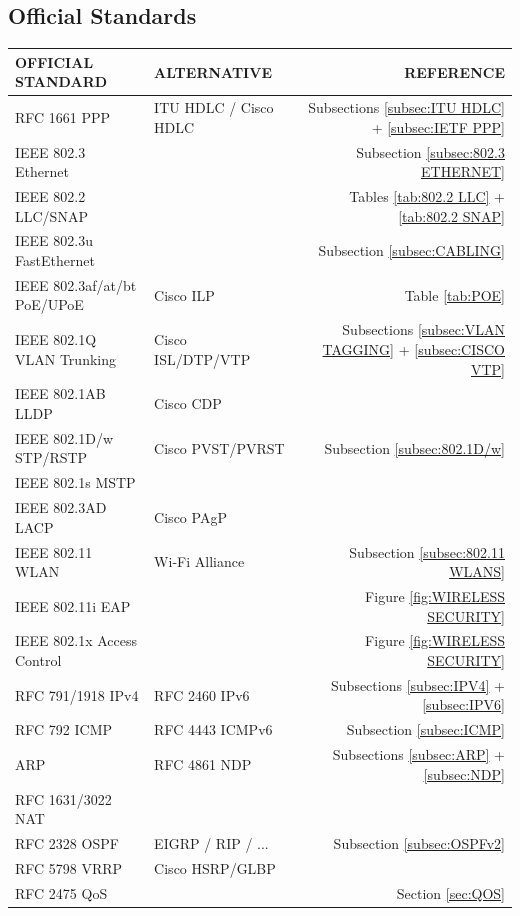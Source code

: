 \documentclass[12pt]{article}
\begin{document}
	\subsection{Official Standards \label{subsec:STANDARDS}}
	\begin{table}[H]
	\centering
	\begin{tabular}{llr}
	\textbf{OFFICIAL STANDARD}	& \textbf{ALTERNATIVE}		& \textbf{REFERENCE}\\\hline
	RFC 1661 PPP			& ITU HDLC / Cisco HDLC	& Subsections \ref{subsec:ITU HDLC} + \ref{subsec:IETF PPP}\\\hline
	IEEE 802.3 Ethernet		&					& Subsection \ref{subsec:802.3 ETHERNET}\\
	IEEE 802.2 LLC/SNAP		&					& Tables \ref{tab:802.2 LLC} + \ref{tab:802.2 SNAP}\\
	IEEE 802.3u FastEthernet		&					& Subsection \ref{subsec:CABLING}\\
	IEEE 802.3af/at/bt PoE/UPoE	& Cisco ILP				& Table \ref{tab:POE}\\\hline
	IEEE 802.1Q VLAN Trunking	& Cisco ISL/DTP/VTP		& Subsections \ref{subsec:VLAN TAGGING} + \ref{subsec:CISCO VTP}\\
	IEEE 802.1AB LLDP		& Cisco CDP			&\\
	IEEE 802.1D/w STP/RSTP		& Cisco PVST/PVRST		& Subsection \ref{subsec:802.1D/w}\\
	IEEE 802.1s MSTP			&					&\\
	IEEE 802.3AD LACP		& Cisco PAgP			&\\\hline
	IEEE 802.11 WLAN			& Wi-Fi Alliance			& Subsection \ref{subsec:802.11 WLANS}\\
	IEEE 802.11i EAP			& 					&Figure \ref{fig:WIRELESS SECURITY}\\
	IEEE 802.1x Access Control	&					& Figure \ref{fig:WIRELESS SECURITY}\\\hline
	RFC 791/1918 IPv4		& RFC 2460 IPv6			& Subsections \ref{subsec:IPV4} + \ref{subsec:IPV6}\\
	RFC 792 ICMP			& RFC 4443 ICMPv6		& Subsection \ref{subsec:ICMP}\\
	ARP					& RFC 4861 NDP			& Subsections \ref{subsec:ARP} + \ref{subsec:NDP}\\
	RFC 1631/3022 NAT		&					&\\
	RFC 2328 OSPF			& EIGRP / RIP / ...			& Subsection \ref{subsec:OSPFv2}\\
	RFC 5798 VRRP			& Cisco HSRP/GLBP		&\\
	RFC 2475 QoS			&					& Section \ref{sec:QOS}\\\hline

\end{tabular}
\end{table}
\end{document}
